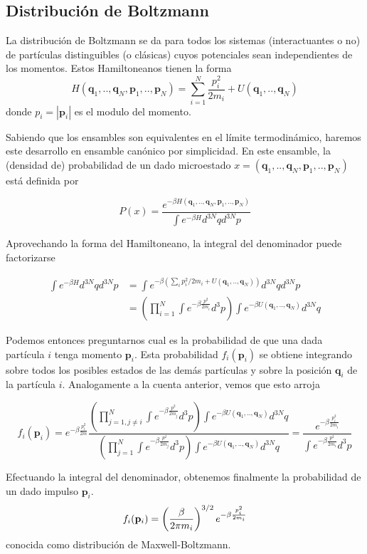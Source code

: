 \subsection{Distribución de Boltzmann}{\label{ap:boltzmann}}

La distribución de Boltzmann se da para todos los sistemas (interactuantes o no) de partículas distinguibles (o clásicas) cuyos potenciales sean independientes de los momentos.
Estos Hamiltoneanos tienen la forma
\[ H(\mathbf{q}_1,..,\mathbf{q}_N,\mathbf{p}_1,..,\mathbf{p}_N) = \sum_{i=1}^N \frac{p_i^2}{2m_i} + U(\mathbf{q}_1,..,\mathbf{q}_N)\]
donde $p_i = |\mathbf{p}_i|$ es el modulo del momento.

Sabiendo que los ensambles son equivalentes en el límite termodinámico, haremos este desarrollo en ensamble canónico por simplicidad.
En este ensamble, la (densidad de) probabilidad de un dado microestado $x=(\mathbf{q}_1,..,\mathbf{q}_N,\mathbf{p}_1,..,\mathbf{p}_N)$ está definida por

\[ P(x) = \frac{e^{-\beta H(\mathbf{q}_1,..,\mathbf{q}_N,\mathbf{p}_1,..,\mathbf{p}_N)}}{\int e^{-\beta H} d^{3N}qd^{3N}p} \]

Aprovechando la forma del Hamiltoneano, la integral del denominador puede factorizarse

\begin{align*}
\int e^{-\beta H} d^{3N}qd^{3N}p &= \int e^{-\beta \left( \sum_i p_i^2/2m_i + U(\mathbf{q}_1,..,\mathbf{q}_N)\right)} d^{3N}qd^{3N}p \\
&= \left(\prod_{i=1}^N\int e^{-\beta\frac{p^2}{2m_i}} d^{3}p\right) \int e^{-\beta U(\mathbf{q}_1,..,\mathbf{q}_N)} d^{3N}q
\end{align*}

Podemos entonces preguntarnos cual es la probabilidad de que una dada partícula $i$ tenga momento $\mathbf{p}_i$.
Esta probabilidad $f_i(\mathbf{p}_i)$ se obtiene integrando sobre todos los posibles estados de las demás partículas y sobre la posición $\mathbf{q}_i$ de la partícula $i$.
Analogamente a la cuenta anterior, vemos que esto arroja

\[ f_i(\mathbf{p}_i) = e^{-\beta\frac{p_i^2}{2m}}\frac{\left(\prod_{j=1, j\neq i}^N\int e^{-\beta\frac{p^2}{2m_j}} d^{3}p\right) \int e^{-\beta U(\mathbf{q}_1,..,\mathbf{q}_N)} d^{3N}q}
{\left(\prod_{j=1}^N\int e^{-\beta\frac{p^2}{2m_j}} d^{3}p\right) \int e^{-\beta U(\mathbf{q}_1,..,\mathbf{q}_N)} d^{3N}q}
= \frac{e^{-\beta\frac{p_i^2}{2m_i}}}{\int e^{-\beta\frac{p^2}{2m_i}} d^3p} \]

Efectuando la integral del denominador, obtenemos finalmente la probabilidad de un dado impulso $\mathbf{p}_i$.
\begin{equation}{\label{eq:dist_MB_imp}}
f_i(\mathbf{p}_i) = \left(\frac{\beta}{2\pi m_i} \right)^{3/2} e^{-\beta\frac{p_i^2}{2m_i}}
\end{equation}
conocida como distribución de Maxwell-Boltzmann.

